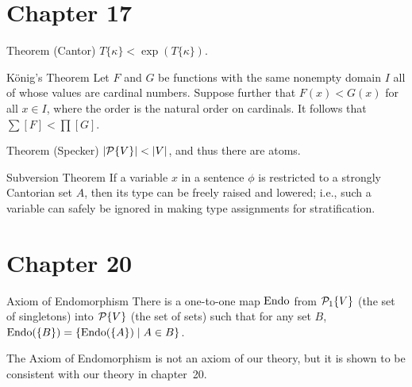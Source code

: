 \section *{Chapter 17}

\begin{Thm}{Theorem (Cantor)}
 $T\{\kappa\} < \exp(T\{\kappa\})$.
\end{Thm}

\begin{Thm}{K\"onig's Theorem}
 Let $F$ and $G$ be functions with the same
 nonempty domain $I$ all of whose values are
 cardinal numbers.  Suppose 
 further that $F(x) < G(x)$ for all $x\in I$, where the order is the
 natural order on cardinals.  It follows that $\sum[F] < \prod[G]$.
\end{Thm}

\begin{Thm}{Theorem (Specker)}
 $|{\cal P}\{V\}| < |V|$, and thus there are atoms.
\end{Thm}

\begin{Thm}{Subversion Theorem}
 If a variable $x$ in a sentence $\phi$ is restricted to a strongly
 Cantorian set $A$, then its
 type can be freely raised and lowered; i.e., 
 such a variable can safely be ignored in making type assignments for
 stratification.
\end{Thm}





\section *{Chapter 20}

\begin{axiom}{Axiom of Endomorphism}
 There is a one-to-one map $\mathop{\mathrm{Endo}}$ from
 ${\cal P}_1\{V\}$ (the set of singletons) into ${\cal
 P}\{V\}$ (the set of sets) such that for any set $B$, $\mathop{\mathrm{Endo}}(\{B\}) =
 \{\mathop{\mathrm{Endo}}(\{A\})\mid A \in B\}$.
\end{axiom}

The Axiom of Endomorphism is not an axiom of our theory, but it is shown to be
consistent with our theory in chapter~20.





